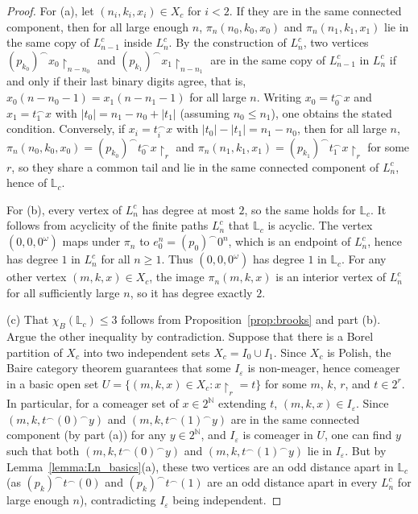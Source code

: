 \documentclass[12pt]{article}
\begin{document}
\begin{proof}
    For (a), let $(n_i,k_i,x_i)\in X_c$ for $i<2$.
    If they are in the same connected component, then for all large enough $n$, $\pi_n(n_0,k_0,x_0)$ and $\pi_n(n_1,k_1,x_1)$ lie in the same copy of $L^c_{n-1}$ inside $L^c_n$.
    By the construction of $L^c_n$, two vertices $(p_{k_0})^\smallfrown x_0\restriction_{n-n_0}$ and $(p_{k_1})^\smallfrown x_1\restriction_{n-n_1}$ are in the same copy of $L^c_{n-1}$ in $L^c_n$ if and only if their last binary digits agree, that is, $x_0(n-n_0-1)=x_1(n-n_1-1)$ for all large $n$.
    Writing $x_0=t_0^\smallfrown x$ and $x_1=t_1^\smallfrown x$ with $|t_0|=n_1-n_0+|t_1|$ (assuming $n_0\leq n_1$), one obtains the stated condition.
    Conversely, if $x_i=t_i^\smallfrown x$ with $|t_0|-|t_1|=n_1-n_0$, then for all large $n$, $\pi_n(n_0,k_0,x_0)=(p_{k_0})^\smallfrown t_0^\smallfrown x\restriction_r$ and $\pi_n(n_1,k_1,x_1)=(p_{k_1})^\smallfrown t_1^\smallfrown x\restriction_r$ for some $r$, so they share a common tail and lie in the same connected component of $L^c_n$, hence of $\mathbb L_c$.

    For (b), every vertex of $L^c_n$ has degree at most $2$, so the same holds for $\mathbb L_c$.
    It follows from acyclicity of the finite paths $L^c_n$ that $\mathbb L_c$ is acyclic.
    The vertex $(0,0,0^\omega)$ maps under $\pi_n$ to $e_0^n=(p_0)^\smallfrown 0^n$, which is an endpoint of $L^c_n$, hence has degree $1$ in $L^c_n$ for all $n\geq1$.
    Thus $(0,0,0^\omega)$ has degree $1$ in $\mathbb L_c$.
    For any other vertex $(m,k,x)\in X_c$, the image $\pi_n(m,k,x)$ is an interior vertex of $L^c_n$ for all sufficiently large $n$, so it has degree exactly $2$.

    (c) That $\chi_B(\mathbb L_c)\leq3$ follows from Proposition~\ref{prop:brooks} and part (b).
    Argue the other inequality by contradiction.
    Suppose that there is a Borel partition of $X_c$ into two independent sets $X_c=I_0\cup I_1$.
    Since $X_c$ is Polish, the Baire category theorem guarantees that some $I_\varepsilon$ is non-meager, hence comeager in a basic open set $U=\{(m,k,x)\in X_c:x\restriction_r=t\}$ for some $m$, $k$, $r$, and $t\in2^r$.
    In particular, for a comeager set of $x\in2^\mathbb N$ extending $t$, $(m,k,x)\in I_\varepsilon$.
    Since $(m,k,t^\smallfrown(0)^\smallfrown y)$ and $(m,k,t^\smallfrown(1)^\smallfrown y)$ are in the same connected component (by part (a)) for any $y\in2^\mathbb N$, and $I_\varepsilon$ is comeager in $U$, one can find $y$ such that both $(m,k,t^\smallfrown(0)^\smallfrown y)$ and $(m,k,t^\smallfrown(1)^\smallfrown y)$ lie in $I_\varepsilon$.
    But by Lemma~\ref{lemma:Ln_basics}(a), these two vertices are an odd distance apart in $\mathbb L_c$ (as $(p_k)^\smallfrown t^\smallfrown(0)$ and $(p_k)^\smallfrown t^\smallfrown(1)$ are an odd distance apart in every $L^c_n$ for large enough $n$), contradicting $I_\varepsilon$ being independent.
\end{proof}
\end{document}
